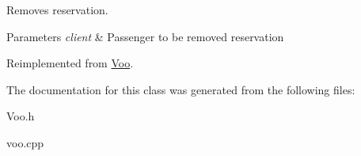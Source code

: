 Removes reservation. 


\begin{DoxyParams}{Parameters}
{\em client} & Passenger to be removed reservation \\
\hline
\end{DoxyParams}


Reimplemented from \hyperlink{class_voo_ab9b59a39248b92a5f106800117436d90}{Voo}.



The documentation for this class was generated from the following files\+:\begin{DoxyCompactItemize}
\item 
Voo.\+h\item 
voo.\+cpp\end{DoxyCompactItemize}
